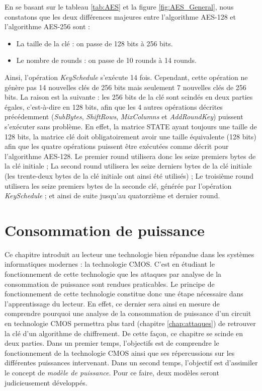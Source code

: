 \documentclass[oneside]{book}
\begin{document}
\vspace{0.25cm}En se basant sur le tableau \ref{tab:AES} et la figure \ref{fig:AES_General}, nous constatons que les deux différences majeures entre l'algorithme AES-128 et l'algorithme AES-256 sont :
\begin{itemize}
\item La taille de la clé : on passe de 128 bits à 256 bits.
\item Le nombre de rounds : on passe de 10 rounds à 14 rounds. \\
\end{itemize}
Ainsi, l'opération \textit{KeySchedule} s'exécute 14 fois. Cependant, cette opération ne génère pas 14 nouvelles clés de 256 bits mais seulement 7 nouvelles clés de 256 bits. La raison est la suivante : les 256 bits de la clé sont scindés en deux parties égales, c'est-à-dire en 128 bits, afin que les 4 autres opérations décrites précédemment (\textit{SubBytes}, \textit{ShiftRows}, \textit{MixColumns} et \textit{AddRoundKey}) puissent s'exécuter sans problème. En effet, la matrice STATE ayant toujours une taille de 128 bits, la matrice clé doit obligatoirement avoir une taille équivalente (128 bits) afin que les quatre opérations puissent être exécutées comme décrit pour l'algorithme AES-128. Le premier round utilisera donc les seize premiers bytes de la clé initiale ; La second round utilisera les seize derniers bytes de la clé initiale (les trente-deux bytes de la clé initiale ont ainsi été utilisés) ; Le troisième round utilisera les seize premiers bytes de la seconde clé, générée par l'opération \textit{KeySchedule} ; et ainsi de suite jusqu'au quatorzième et dernier round.



\newpage


\chapter{Consommation de puissance}

Ce chapitre introduit au lecteur une technologie bien répandue dans les systèmes informatiques modernes : la technologie CMOS. C'est en étudiant le fonctionnement de cette technologie que les attaques par analyse de la consommation de puissance sont rendues praticables. Le principe de fonctionnement de cette technologie constitue donc une étape nécessaire dans l'apprentissage du lecteur. En effet, ce dernier sera ainsi en mesure de comprendre pourquoi une analyse de la consommation de puissance d'un circuit en technologie CMOS permettra plus tard (chapitre \ref{chap:attaques}) de retrouver la clé d'un algorithme de chiffrement. De cette façon, ce chapitre se scinde en deux parties. Dans un premier temps, l'objectifs est de comprendre le fonctionnement de la technologie CMOS ainsi que ses répercussions sur les différentes puissances intervenant. Dans un second temps, l'objectif est d'assimiler le concept de \textit{modèle de puissance}. Pour ce faire, deux modèles seront judicieusement développés.
\end{document}
